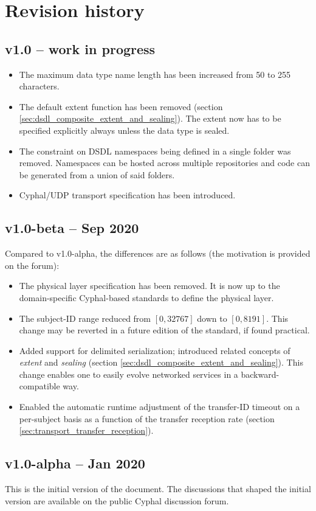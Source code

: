 \section{Revision history}

\subsection{v1.0 -- work in progress}

\begin{itemize}
    \item The maximum data type name length has been increased from 50 to 255 characters.

    \item The default extent function has been removed (section \ref{sec:dsdl_composite_extent_and_sealing}).
    The extent now has to be specified explicitly always unless the data type is sealed.

    \item The constraint on DSDL namespaces being defined in a single folder was removed. Namespaces can be hosted
    across multiple repositories and code can be generated from a union of said folders.

    \item Cyphal/UDP transport specification has been introduced.
\end{itemize}

\subsection{v1.0-beta -- Sep 2020}

Compared to v1.0-alpha, the differences are as follows (the motivation is provided on the forum):

\begin{itemize}
    \item The physical layer specification has been removed.
    It is now up to the domain-specific Cyphal-based standards to define the physical layer.

    \item The subject-ID range reduced from $[0, 32767]$ down to $[0, 8191]$.
    This change may be reverted in a future edition of the standard, if found practical.

    \item Added support for delimited serialization; introduced related concepts of \emph{extent} and \emph{sealing}
    (section \ref{sec:dsdl_composite_extent_and_sealing}).
    This change enables one to easily evolve networked services in a backward-compatible way.

    \item Enabled the automatic runtime adjustment of the transfer-ID timeout on a per-subject basis
    as a function of the transfer reception rate (section \ref{sec:transport_transfer_reception}).
\end{itemize}

\subsection{v1.0-alpha -- Jan 2020}

This is the initial version of the document.
The discussions that shaped the initial version are available on the public Cyphal discussion forum.
